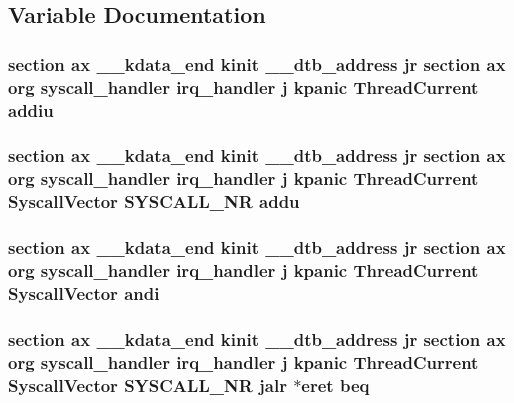 \subsection{Variable Documentation}
\hypertarget{mips_2entry_8S_aae5f46ad86c522e1de85124f02dc03eb}{
\subsubsection[{addiu}]{\setlength{\rightskip}{0pt plus 5cm}section ax {\bf \-\_\-\-\_\-kdata\-\_\-end} {\bf kinit} \-\_\-\-\_\-dtb\-\_\-address jr section ax org {\bf syscall\-\_\-handler} {\bf irq\-\_\-handler} j {\bf kpanic} {\bf Thread\-Current} addiu}}\label{mips_2entry_8S_aae5f46ad86c522e1de85124f02dc03eb}
\hypertarget{mips_2entry_8S_a682077bbfc5c816e663862d043c9c7b9}{
\subsubsection[{addu}]{\setlength{\rightskip}{0pt plus 5cm}section ax {\bf \-\_\-\-\_\-kdata\-\_\-end} {\bf kinit} \-\_\-\-\_\-dtb\-\_\-address jr section ax org {\bf syscall\-\_\-handler} {\bf irq\-\_\-handler} j {\bf kpanic} {\bf Thread\-Current} {\bf Syscall\-Vector} {\bf S\-Y\-S\-C\-A\-L\-L\-\_\-\-N\-R} addu}}\label{mips_2entry_8S_a682077bbfc5c816e663862d043c9c7b9}
\hypertarget{mips_2entry_8S_a1d8aee1caeac6c96721f7c6296321af9}{
\subsubsection[{andi}]{\setlength{\rightskip}{0pt plus 5cm}section ax {\bf \-\_\-\-\_\-kdata\-\_\-end} {\bf kinit} \-\_\-\-\_\-dtb\-\_\-address jr section ax org {\bf syscall\-\_\-handler} {\bf irq\-\_\-handler} j {\bf kpanic} {\bf Thread\-Current} {\bf Syscall\-Vector} andi}}\label{mips_2entry_8S_a1d8aee1caeac6c96721f7c6296321af9}
\hypertarget{mips_2entry_8S_a744f7a335784b23d045867be1a1a37a5}{
\subsubsection[{beq}]{\setlength{\rightskip}{0pt plus 5cm}section ax {\bf \-\_\-\-\_\-kdata\-\_\-end} {\bf kinit} \-\_\-\-\_\-dtb\-\_\-address jr section ax org {\bf syscall\-\_\-handler} {\bf irq\-\_\-handler} j {\bf kpanic} {\bf Thread\-Current} {\bf Syscall\-Vector} {\bf S\-Y\-S\-C\-A\-L\-L\-\_\-\-N\-R} jalr $\ast$eret beq}}\label{mips_2entry_8S_a744f7a335784b23d045867be1a1a37a5}
